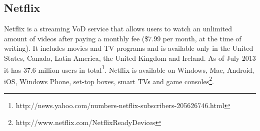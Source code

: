 \subsection{Netflix}
Netflix is a streaming VoD service that allows users to watch an unlimited amount of videos after paying a monthly fee (\$7.99 per month, at the time of writing). It includes movies and TV programs and is available only in the United States, Canada, Latin America, the United Kingdom and Ireland. As of July 2013 it has 37.6 million users in total\footnote{http://news.yahoo.com/numbers-netflix-subscribers-205626746.html}. Netflix is available on Windows, Mac, Android, iOS, Windows Phone, set-top boxes, smart TVs and game consoles\footnote{http://www.netflix.com/NetflixReadyDevices}.